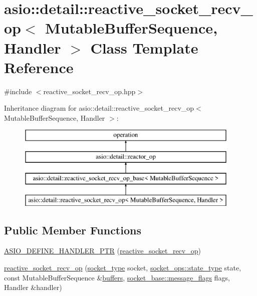 \hypertarget{classasio_1_1detail_1_1reactive__socket__recv__op}{}\section{asio\+:\+:detail\+:\+:reactive\+\_\+socket\+\_\+recv\+\_\+op$<$ Mutable\+Buffer\+Sequence, Handler $>$ Class Template Reference}
\label{classasio_1_1detail_1_1reactive__socket__recv__op}


{\ttfamily \#include $<$reactive\+\_\+socket\+\_\+recv\+\_\+op.\+hpp$>$}

Inheritance diagram for asio\+:\+:detail\+:\+:reactive\+\_\+socket\+\_\+recv\+\_\+op$<$ Mutable\+Buffer\+Sequence, Handler $>$\+:\begin{figure}[H]
\begin{center}
\leavevmode
\includegraphics[height=4.000000cm]{classasio_1_1detail_1_1reactive__socket__recv__op}
\end{center}
\end{figure}
\subsection*{Public Member Functions}
\begin{DoxyCompactItemize}
\item 
\hyperlink{classasio_1_1detail_1_1reactive__socket__recv__op_a52abe5194c38ad0826ced0754eaef582}{A\+S\+I\+O\+\_\+\+D\+E\+F\+I\+N\+E\+\_\+\+H\+A\+N\+D\+L\+E\+R\+\_\+\+P\+T\+R} (\hyperlink{classasio_1_1detail_1_1reactive__socket__recv__op}{reactive\+\_\+socket\+\_\+recv\+\_\+op})
\item 
\hyperlink{classasio_1_1detail_1_1reactive__socket__recv__op_a15c5dc4ad1331f8c1296c969b0030d66}{reactive\+\_\+socket\+\_\+recv\+\_\+op} (\hyperlink{namespaceasio_1_1detail_a6798c771dd84b79798b1a08150706ea9}{socket\+\_\+type} socket, \hyperlink{namespaceasio_1_1detail_1_1socket__ops_a5ce32ee297edef8833113ea35a933054}{socket\+\_\+ops\+::state\+\_\+type} state, const Mutable\+Buffer\+Sequence \&\hyperlink{group__async__read_ga54dede45c3175148a77fe6635222c47d}{buffers}, \hyperlink{classasio_1_1socket__base_ac3cf77465dfedfe1979b5415cf32cc94}{socket\+\_\+base\+::message\+\_\+flags} flags, Handler \&handler)
\end{DoxyCompactItemize}
